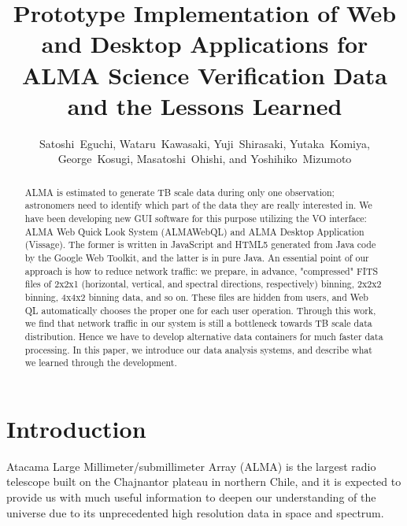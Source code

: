 
\resetcounters




\title{Prototype Implementation of Web and Desktop Applications for ALMA Science Verification Data and the Lessons Learned}
\author{Satoshi~Eguchi, Wataru~Kawasaki, Yuji~Shirasaki, Yutaka~Komiya, George~Kosugi, Masatoshi~Ohishi, and Yoshihiko~Mizumoto
}


\begin{abstract}
ALMA is estimated to generate TB scale data during only one observation; astronomers need to identify which part of the data they are really interested in. We have been developing new GUI software for this purpose utilizing the VO interface: ALMA Web Quick Look System (ALMAWebQL) and ALMA Desktop Application (Vissage). The former is written in JavaScript and HTML5 generated from Java code by the Google Web Toolkit, and the latter is in pure Java. An essential point of our approach is how to reduce network traffic: we prepare, in advance, "compressed" FITS files of 2x2x1 (horizontal, vertical, and spectral directions, respectively) binning, 2x2x2 binning, 4x4x2 binning data, and so on. These files are hidden from users, and Web QL automatically chooses the proper one for each user operation. Through this work, we find that network traffic in our system is still a bottleneck towards TB scale data distribution. Hence we have to develop alternative data containers for much faster data processing. In this paper, we introduce our data analysis systems, and describe what we learned through the development.
\end{abstract}

\section{Introduction}

Atacama Large Millimeter/submillimeter Array (ALMA) is the largest radio telescope built on the Chajnantor plateau in northern Chile, and it is expected to provide us with much useful information to deepen our understanding of the universe due to its unprecedented high resolution data in space and spectrum.

